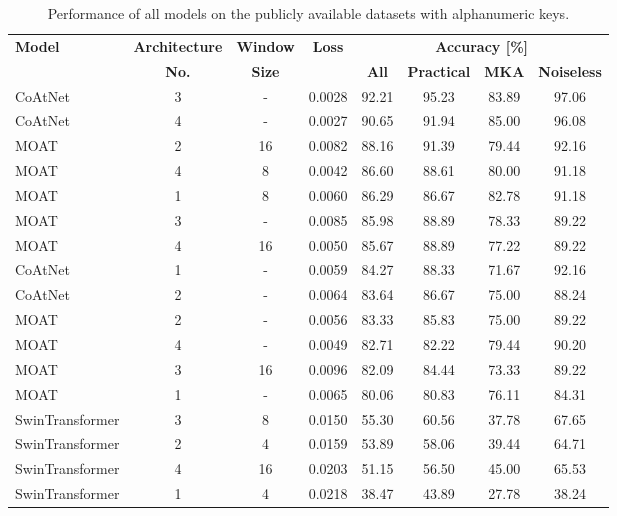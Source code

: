 \documentclass[a4paper,11pt,twoside]{report}
\theoremstyle{definition}
\begin{document}
\begin{table}[h!]
\centering
\caption{Performance of all models on the publicly available datasets with alphanumeric keys.}
\begin{adjustbox}{max width=\textwidth}
\begin{tabular}{l|c|c|c|cccc}
\hline
\textbf{Model} & \textbf{Architecture} & \textbf{Window} & \textbf{Loss} & \multicolumn{4}{c}{\textbf{Accuracy [\%]}} \\
\cline{5-8}
       &   \textbf{No.}  &   \textbf{Size}   &   & \textbf{All} & \textbf{Practical} & \textbf{MKA} & \textbf{Noiseless}  \\
\hline
CoAtNet & 3 & - & 0.0028 & 92.21 & 95.23 & 83.89 & 97.06  \\
CoAtNet & 4 & - & 0.0027 & 90.65 & 91.94 & 85.00 & 96.08  \\
MOAT & 2 & 16 & 0.0082 & 88.16 & 91.39 & 79.44 & 92.16  \\
MOAT & 4 & 8 & 0.0042 & 86.60 & 88.61 & 80.00 & 91.18  \\
MOAT & 1 & 8 & 0.0060 & 86.29 & 86.67 & 82.78 & 91.18  \\
MOAT & 3 & - & 0.0085 & 85.98 & 88.89 & 78.33 & 89.22  \\
MOAT & 4 & 16 & 0.0050 & 85.67 & 88.89 & 77.22 & 89.22  \\
CoAtNet & 1 & - & 0.0059 & 84.27 & 88.33 & 71.67 & 92.16  \\
CoAtNet & 2 & - & 0.0064 & 83.64 & 86.67 & 75.00 & 88.24  \\
MOAT & 2 & - & 0.0056 & 83.33 & 85.83 & 75.00 & 89.22  \\
MOAT & 4 & - & 0.0049 & 82.71 & 82.22 & 79.44 & 90.20  \\
MOAT & 3 & 16 & 0.0096 & 82.09 & 84.44 & 73.33 & 89.22  \\
MOAT & 1 & - & 0.0065 & 80.06 & 80.83 & 76.11 & 84.31  \\
SwinTransformer & 3 & 8 & 0.0150 & 55.30 & 60.56 & 37.78 & 67.65  \\
SwinTransformer & 2 & 4 & 0.0159 & 53.89 & 58.06 & 39.44 & 64.71  \\
SwinTransformer & 4 & 16 & 0.0203 & 51.15 & 56.50 & 45.00 & 65.53  \\
SwinTransformer & 1 & 4 & 0.0218 & 38.47 & 43.89 & 27.78 & 38.24  \\
\hline
\end{tabular}
\end{adjustbox}
\label{tab:alphanumeric_clean_results}
\end{table}
\end{document}
